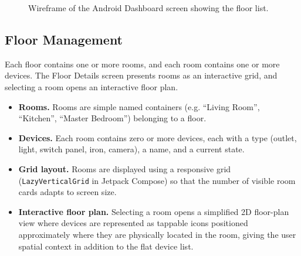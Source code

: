 \documentclass[11pt,a4paper]{article}
\begin{document}
\begin{figure}[H]
\centering
{}
\caption{Wireframe of the Android Dashboard screen showing the floor list.}
\label{fig:wireframe-dashboard}
\end{figure}

\subsection{Floor Management}
Each floor contains one or more rooms, and each room contains one or more devices. The Floor Details screen presents rooms as an interactive grid, and selecting a room opens an interactive floor plan.

\begin{itemize}
    \item \textbf{Rooms.} Rooms are simple named containers (e.g. ``Living Room'', ``Kitchen'', ``Master Bedroom'') belonging to a floor.
    \item \textbf{Devices.} Each room contains zero or more devices, each with a type (outlet, light, switch panel, iron, camera), a name, and a current state.
    \item \textbf{Grid layout.} Rooms are displayed using a responsive grid (\texttt{LazyVerticalGrid} in Jetpack Compose) so that the number of visible room cards adapts to screen size.
    \item \textbf{Interactive floor plan.} Selecting a room opens a simplified 2D floor-plan view where devices are represented as tappable icons positioned approximately where they are physically located in the room, giving the user spatial context in addition to the flat device list.
\end{itemize}
\end{document}
